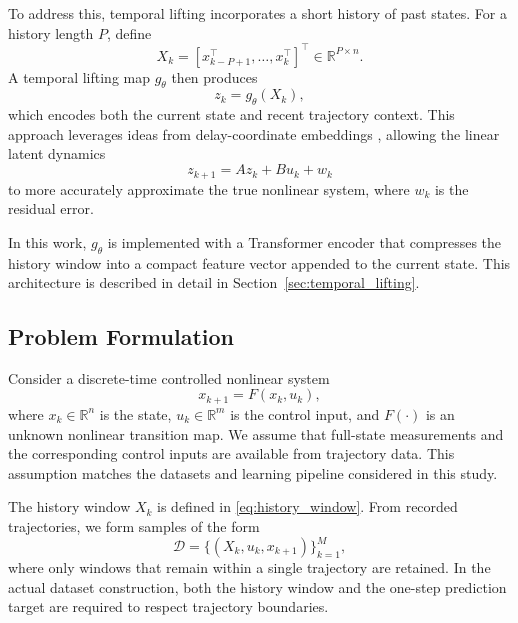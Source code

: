 \documentclass[journal]{IEEEtran}
\begin{document}
To address this, temporal lifting incorporates a short history of past states. For a history length $P$, define
\begin{equation}
    X_k = [x_{k-P+1}^\top, \ldots, x_k^\top]^\top \in \mathbb{R}^{P\times n}.
    \label{eq:history_window}
\end{equation}
A temporal lifting map $g_\theta$ then produces
\begin{equation}
    z_k = g_\theta(X_k),
    \label{eq:temporal_lifting}
\end{equation}
which encodes both the current state and recent trajectory context. This approach leverages ideas from delay-coordinate embeddings \cite{arbabi2017ergodic, rank2019recurrent}, allowing the linear latent dynamics
\begin{equation}
    z_{k+1} = A z_k + B u_k + w_k
\end{equation}
to more accurately approximate the true nonlinear system, where $w_k$ is the residual error.

In this work, $g_\theta$ is implemented with a Transformer encoder that compresses the history window into a compact feature vector appended to the current state. This architecture is described in detail in Section~\ref{sec:temporal_lifting}.


\subsection{Problem Formulation}
\label{sec:problem}

Consider a discrete-time controlled nonlinear system
\begin{equation}
    x_{k+1} = F(x_k,u_k),
    \label{eq:nonlinear_system}
\end{equation}
where $x_k \in \mathbb{R}^n$ is the state, $u_k \in \mathbb{R}^m$ is the control input, and $F(\cdot)$ is an unknown nonlinear transition map. We assume that full-state measurements and the corresponding control inputs are available from trajectory data. This assumption matches the datasets and learning pipeline considered in this study.

The history window $X_k$ is defined in \eqref{eq:history_window}. From recorded trajectories, we form samples of the form
\begin{equation}
    \mathcal{D} = \{(X_k,u_k,x_{k+1})\}_{k=1}^{M},
    \label{eq:dataset}
\end{equation}
where only windows that remain within a single trajectory are retained. In the actual dataset construction, both the history window and the one-step prediction target are required to respect trajectory boundaries.
\end{document}
